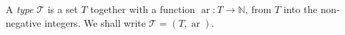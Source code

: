 A \emph{type} $\mathcal{T}$ is a set $T$ together with a function $\operatorname{ar}: T \to \mathbb{N}$, from $T$ into the non-negative integers. We shall write $\mathcal{T} = (T, \operatorname{ar})$.
